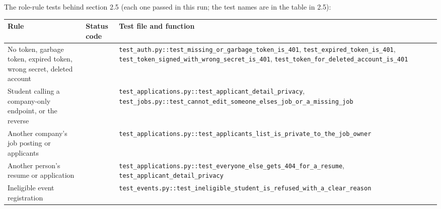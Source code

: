 \documentclass[11pt,letterpaper]{article}
\newcommand{\code}[1]{\texttt{#1}}
\begin{document}
The role-rule tests behind section 2.5 (each one passed in this run; the test names are in the table in 2.5):

{\small
\begin{longtable}{>{\raggedright\arraybackslash}p{}>{\centering\arraybackslash}p{}>{\raggedright\arraybackslash}p{}}
\hline
\textbf{Rule} & \textbf{Status code} & \textbf{Test file and function} \\ \hline
\endhead
No token, garbage token, expired token, wrong secret, deleted account & 401 & \code{test\_\allowbreak{}auth.\allowbreak{}py:\allowbreak{}:\allowbreak{}test\_\allowbreak{}missing\_\allowbreak{}or\_\allowbreak{}garbage\_\allowbreak{}token\_\allowbreak{}is\_\allowbreak{}401}, \code{test\_\allowbreak{}expired\_\allowbreak{}token\_\allowbreak{}is\_\allowbreak{}401}, \code{test\_\allowbreak{}token\_\allowbreak{}signed\_\allowbreak{}with\_\allowbreak{}wrong\_\allowbreak{}secret\_\allowbreak{}is\_\allowbreak{}401}, \code{test\_\allowbreak{}token\_\allowbreak{}for\_\allowbreak{}deleted\_\allowbreak{}account\_\allowbreak{}is\_\allowbreak{}401} \\ \hline
Student calling a company-only endpoint, or the reverse & 403 & \code{test\_\allowbreak{}applications.\allowbreak{}py:\allowbreak{}:\allowbreak{}test\_\allowbreak{}applicant\_\allowbreak{}detail\_\allowbreak{}privacy}, \code{test\_\allowbreak{}jobs.\allowbreak{}py:\allowbreak{}:\allowbreak{}test\_\allowbreak{}cannot\_\allowbreak{}edit\_\allowbreak{}someone\_\allowbreak{}elses\_\allowbreak{}job\_\allowbreak{}or\_\allowbreak{}a\_\allowbreak{}missing\_\allowbreak{}job} \\ \hline
Another company's job posting or applicants & 403 & \code{test\_\allowbreak{}applications.\allowbreak{}py:\allowbreak{}:\allowbreak{}test\_\allowbreak{}applicants\_\allowbreak{}list\_\allowbreak{}is\_\allowbreak{}private\_\allowbreak{}to\_\allowbreak{}the\_\allowbreak{}job\_\allowbreak{}owner} \\ \hline
Another person's resume or application & 404 & \code{test\_\allowbreak{}applications.\allowbreak{}py:\allowbreak{}:\allowbreak{}test\_\allowbreak{}everyone\_\allowbreak{}else\_\allowbreak{}gets\_\allowbreak{}404\_\allowbreak{}for\_\allowbreak{}a\_\allowbreak{}resume}, \code{test\_\allowbreak{}applicant\_\allowbreak{}detail\_\allowbreak{}privacy} \\ \hline
Ineligible event registration & 403 & \code{test\_\allowbreak{}events.\allowbreak{}py:\allowbreak{}:\allowbreak{}test\_\allowbreak{}ineligible\_\allowbreak{}student\_\allowbreak{}is\_\allowbreak{}refused\_\allowbreak{}with\_\allowbreak{}a\_\allowbreak{}clear\_\allowbreak{}reason} \\ \hline

\end{longtable}}
\end{document}
